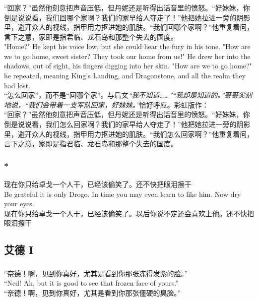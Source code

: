 \documentclass[12pt,a4paper]{article}
\newcommand{\h}[1]{{\color{red}#1}\\}
\newcommand{\la}[1]{{\color{blue}#1}\\}
\begin{document}
\subsubsection{}
\la{“回家？”虽然他刻意把声音压低，但丹妮还是听得出话音里的愤怒。“好妹妹，你倒是说说看，我们回哪个家啊？我们的家早给人夺走了！”他把她拉进一旁的阴影里，避开众人的视线，指甲用力抠进她的肌肤。“我们回哪个家啊？”他重复着问，言下之意，家即是指君临、龙石岛和那整个失去的国度。\\
"Home?" He kept his voice low, but she could hear the fury in his tone. "How are we to go home, sweet sister? They took our home from us!" He drew her into the shadows, out of sight, his fingers digging into her skin. "How are we to go home?" he repeated, meaning King's Landing, and Dragonstone, and all the realm they had lost.}
\h{“怎么回家”，而不是“回哪个家”。与后文\emph{“我不知道……”“我却是知道的。”哥哥尖刻地说，“我们会带着一支军队回家，好妹妹。”}恰好呼应。彩虹版作：}
“回家？”虽然他刻意把声音压低，但丹妮还是听得出话音里的愤怒。“好妹妹，你倒是说说看，我们怎么回家啊？我们的家早给人夺走了！”他把她拉进一旁的阴影里，避开众人的视线，指甲用力抠进她的肌肤。“我们怎么回家啊？”他重复着问，言下之意，家即是指君临、龙石岛和那整个失去的国度。

\subsubsection{\color{red}*}
\la{现在你只给卓戈一个人干，已经该偷笑了。还不快把眼泪擦干\\
Be grateful it is only Drogo. In time you may even learn to like him. Now dry your eyes.}
现在你只给卓戈一个人干，已经该偷笑了。以后你说不定还会喜欢上他。还不快把眼泪擦干

\subsection{艾德 I}
\subsubsection{}\label{1.4.1}
\la{ “奈德！啊，见到你真好，尤其是看到你那张冻得发紫的脸。”\\
 “Ned! Ah, but it is good to see that frozen face of yours.”}
 “奈德！啊，见到你真好，尤其是看到你那张僵硬的臭脸。”
\end{document}
